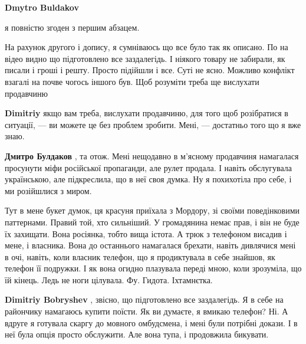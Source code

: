 \begin{itemize}
\begin{itemize}
\textbf{Dmytro Buldakov} 

я повністю згоден з першим абзацем.

На рахунок другого і допису, я сумніваюсь що все було так як описано. По на
відео видно що підготовлено все заздалегідь. І ніякого товару не забирали, як
писали і гроші і решту. Просто підійшли і все. Суті не ясно. Можливо конфлікт
взагалі на почве чогось іншого був. Щоб розуміти треба ще вислухати продавчиню


 
\textbf{Dimitriy} якщо вам треба, вислухати продавчиню, для того щоб
розібратися в ситуації, — ви можете це без проблем зробити. Мені, — достатньо
того що я вже знаю.

 
\textbf{Дмитро Булдаков} , та отож. Мені нещодавно в м'ясному продавчиня
намагалася просунути міфи російської пропаганди, але рулет продала. І навіть
обслугувала українською, але підкреслила, що в неї своя думка. Ну я похихотіла
про себе, і ми розійшлися з миром. 

Тут в мене букет думок, ця красуня приїхала
з Мордору, зі своїми поведінковими паттернами. Правий той, хто сильніший. У
громадянина немає прав, і він не буде їх захищати. Вона росіянка, тобто вища
істота. А трюк з телефоном висадив і мене, і власника. Вона до останнього
намагалася брехати, навіть дивлячися мені в очі, навіть, коли власник телефон,
що я продиктувала в себе знайшов, як телефон її подружки. І як вона огидно
плазувала переді мною, коли зрозуміла, що їй кінець. Ледь не ноги цілувала. Фу.
Гидота. Іхтамнєтка.

 
\textbf{Dimitriy Bobryshev} , звісно, що підготовлено все заздалегідь. Я в себе
на райончику намагаюсь купити поїсти. Як ви думаєте, я вмикаю телефон? Ні. А
вдруге я готувала скаргу до мовного омбудсмена, і мені були потрібні докази. І
в неї була опція просто обслужити. Але вона тупа, і продовжила бикувати.


\end{itemize}
\end{itemize}

